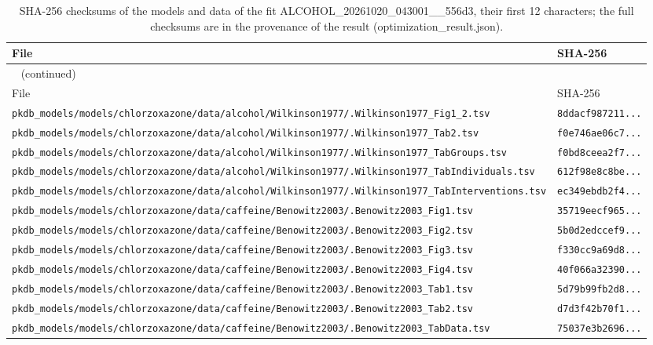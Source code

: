 \documentclass{article}
\begin{document}
\begin{longtable}{ll}
\caption{SHA-256 checksums of the models and data of the fit ALCOHOL\_20261020\_043001\_\_556d3, their first 12 characters; the full checksums are in the provenance of the result (optimization\_result.json).}\label{tab:checksums:ALCOHOL_20261020_043001__556d3} \\
\toprule
File & SHA-256 \\
\midrule
\endfirsthead
\multicolumn{2}{l}{\small\tablename~\thetable{} (continued)} \\
\toprule
File & SHA-256 \\
\midrule
\endhead
\bottomrule
\endlastfoot
\texttt{pkdb\_models/models/chlorzoxazone/data/alcohol/Wilkinson1977/.Wilkinson1977\_Fig1\_2.tsv} & \texttt{8ddacf987211...} \\
\texttt{pkdb\_models/models/chlorzoxazone/data/alcohol/Wilkinson1977/.Wilkinson1977\_Tab2.tsv} & \texttt{f0e746ae06c7...} \\
\texttt{pkdb\_models/models/chlorzoxazone/data/alcohol/Wilkinson1977/.Wilkinson1977\_TabGroups.tsv} & \texttt{f0bd8ceea2f7...} \\
\texttt{pkdb\_models/models/chlorzoxazone/data/alcohol/Wilkinson1977/.Wilkinson1977\_TabIndividuals.tsv} & \texttt{612f98e8c8be...} \\
\texttt{pkdb\_models/models/chlorzoxazone/data/alcohol/Wilkinson1977/.Wilkinson1977\_TabInterventions.tsv} & \texttt{ec349ebdb2f4...} \\
\texttt{pkdb\_models/models/chlorzoxazone/data/caffeine/Benowitz2003/.Benowitz2003\_Fig1.tsv} & \texttt{35719eecf965...} \\
\texttt{pkdb\_models/models/chlorzoxazone/data/caffeine/Benowitz2003/.Benowitz2003\_Fig2.tsv} & \texttt{5b0d2edccef9...} \\
\texttt{pkdb\_models/models/chlorzoxazone/data/caffeine/Benowitz2003/.Benowitz2003\_Fig3.tsv} & \texttt{f330cc9a69d8...} \\
\texttt{pkdb\_models/models/chlorzoxazone/data/caffeine/Benowitz2003/.Benowitz2003\_Fig4.tsv} & \texttt{40f066a32390...} \\
\texttt{pkdb\_models/models/chlorzoxazone/data/caffeine/Benowitz2003/.Benowitz2003\_Tab1.tsv} & \texttt{5d79b99fb2d8...} \\
\texttt{pkdb\_models/models/chlorzoxazone/data/caffeine/Benowitz2003/.Benowitz2003\_Tab2.tsv} & \texttt{d7d3f42b70f1...} \\
\texttt{pkdb\_models/models/chlorzoxazone/data/caffeine/Benowitz2003/.Benowitz2003\_TabData.tsv} & \texttt{75037e3b2696...} \\

\end{longtable}
\end{document}
